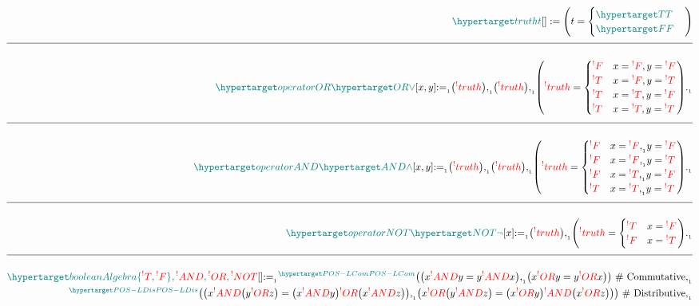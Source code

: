 \documentclass[a4paper]{article}
\makeatletter
\def\ml{\mleft}
\def\mr{\mright}
\newcommand{\defeq}{:=}
\newcommand{\cusnum}[2]{{#1}_{{\phantom{ }}_{#2}}}
\newcommand{\cusand}{,}
\newcommand{\cuspop}{.}
\newcommand{\eqComment}[1]{\text{  \# #1}}
\newcommand{\n}{\\[1.5ex] \hline \nonumber \\[0ex]}
\newcommand{\m}{\nonumber \\}
\newcommand\rfrlist[1]{%
    \forcsvlist{\rfrlist@item}{#1}
}
\newcommand\rfrlist@item[1]{\rfr{#1}\\}
\newcommand{\thmlink}[2]{{}_{\substack{\rfrlist{#1}}}^{\dfn{#2}} }
\makeatother
\begin{document}
\begin{tcolorbox}
\begin{align}
   \dfn{truth} [t][] \defeq \ml(t = \begin{cases} \dfn{T} \\ \dfn{F} \end{cases}\mr) 
\n \dfn{operatorOR} [\dfn{OR}[\lor]][x, y] \cusnum{\defeq}{1} \ml(\rfr{truth} [x][]\mr) \cusnum{\cusand}{1} \ml(\rfr{truth} [y][]\mr) \cusnum{\cusand}{1} \ml(\rfr{truth} [x \rfr{OR} y][] = \begin{cases} \rfr{F} & x = \rfr{F} \cusand y = \rfr{F} \\ \rfr{T} & x = \rfr{F} \cusand y = \rfr{T} \\ \rfr{T} & x = \rfr{T} \cusand y = \rfr{F} \\ \rfr{T} & x = \rfr{T} \cusand y = \rfr{T} \end{cases}\mr) \cusnum{\cuspop}{1}
\n \dfn{operatorAND} [\dfn{AND}[\land]][x, y] \cusnum{\defeq}{1} \ml(\rfr{truth} [x][]\mr) \cusnum{\cusand}{1} \ml(\rfr{truth} [y][]\mr) \cusnum{\cusand}{1} \ml(\rfr{truth} [x \rfr{AND} y][] = \begin{cases} \rfr{F} & x = \rfr{F} \cusnum{\cusand}{1} y = \rfr{F} \\ \rfr{F} & x = \rfr{F} \cusnum{\cusand}{1} y = \rfr{T} \\ \rfr{F} & x = \rfr{T} \cusnum{\cusand}{1} y = \rfr{F} \\ \rfr{T} & x = \rfr{T} \cusnum{\cusand}{1} y = \rfr{T} \end{cases}\mr) \cusnum{\cuspop}{1}
\n \dfn{operatorNOT} [\dfn{NOT}[\lnot]][x] \cusnum{\defeq}{1} \ml(\rfr{truth} [x][]\mr) \cusnum{\cusand}{1} \ml(\rfr{truth} [\rfr{NOT} x][] = \begin{cases} \rfr{T} & x = \rfr{F} \\ \rfr{F} & x = \rfr{T} \end{cases}\mr) \cusnum{\cuspop}{1} 
\n \dfn{booleanAlgebra} [\{\rfr{T}, \rfr{F}\}, \rfr{AND}, \rfr{OR}, \rfr{NOT}][] \cusnum{\defeq}{1} \thmlink{}{POS-LCom} \ml(\ml(x \rfr{AND} y = y \rfr{AND} x\mr) \cusnum{\cusand}{1} \ml(x \rfr{OR} y = y \rfr{OR} x\mr)\mr) \eqComment{Commutative} \cusnum{\cusand}{1}
\m \thmlink{}{POS-LDis} \ml(\ml(x \rfr{AND} \ml(y \rfr{OR} z\mr) = \ml(x \rfr{AND} y\mr) \rfr{OR} \ml(x \rfr{AND} z\mr)\mr) \cusnum{\cusand}{1} \ml(x \rfr{OR} \ml(y \rfr{AND} z\mr) = \ml(x \rfr{OR} y\mr) \rfr{AND} \ml(x \rfr{OR} z\mr)\mr)\mr) \eqComment{Distributive} \cusnum{\cusand}{1}

\end{align}
\end{tcolorbox}
\end{document}

